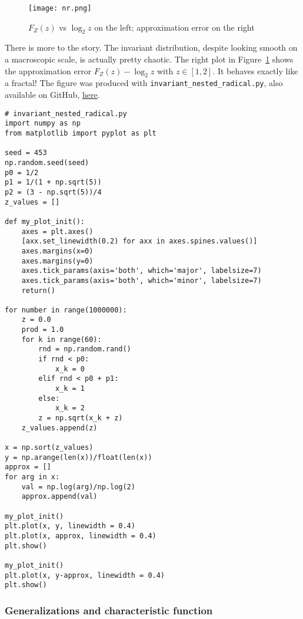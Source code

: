 \documentclass[oneside,10pt]{book}
\begin{document}
\begin{figure}[H]
\centering
\texttt{[image: nr.png]}
\caption{$F_Z(z)$ vs $\log_2 z$ on the left; approximation error on the right}
\label{fig:botul}
\end{figure}




There is more to the story. The invariant distribution, despite looking smooth on a macroscopic scale, is actually pretty chaotic.
The right plot in Figure~\ref{fig:botul} shows the approximation error $F_Z(z)-\log_2 z$ with $z\in [1,2]$. It behaves exactly like a fractal!
The figure was produced with \texttt{invariant\_nested\_radical.py}, also available
 on GitHub,  \href{https://github.com/VincentGranville/Stochastic-Processes/blob/master/invariant_nested_radicals.py}{here}.\vspace{1ex}

\begin{lstlisting}
# invariant_nested_radical.py
import numpy as np
from matplotlib import pyplot as plt

seed = 453
np.random.seed(seed)
p0 = 1/2
p1 = 1/(1 + np.sqrt(5))
p2 = (3 - np.sqrt(5))/4
z_values = []

def my_plot_init():
    axes = plt.axes()
    [axx.set_linewidth(0.2) for axx in axes.spines.values()]
    axes.margins(x=0)
    axes.margins(y=0)
    axes.tick_params(axis='both', which='major', labelsize=7)
    axes.tick_params(axis='both', which='minor', labelsize=7)
    return()

for number in range(1000000):
    z = 0.0
    prod = 1.0
    for k in range(60):
        rnd = np.random.rand()
        if rnd < p0:
            x_k = 0
        elif rnd < p0 + p1:
            x_k = 1
        else:
            x_k = 2
        z = np.sqrt(x_k + z)
    z_values.append(z)

x = np.sort(z_values)
y = np.arange(len(x))/float(len(x))
approx = []
for arg in x:
    val = np.log(arg)/np.log(2)
    approx.append(val)

my_plot_init()
plt.plot(x, y, linewidth = 0.4)
plt.plot(x, approx, linewidth = 0.4)
plt.show()

my_plot_init()
plt.plot(x, y-approx, linewidth = 0.4)
plt.show()
\end{lstlisting}

\subsubsection{Generalizations and characteristic function}
\end{document}
